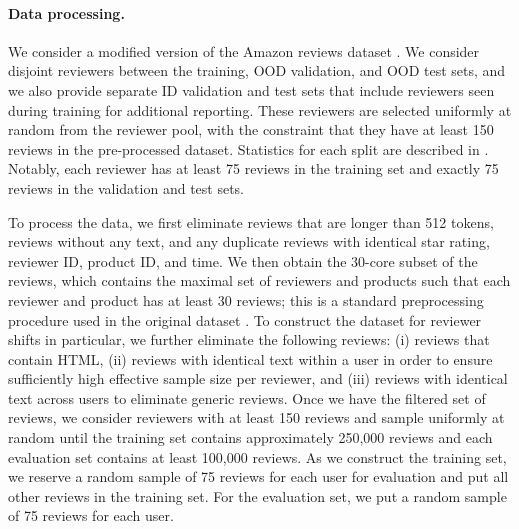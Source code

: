 \begin{table}[!tbp]
  \caption{Dataset details for \Amazon.}\label{tab:dataset_amazon}
  \centering
\end{table}


\paragraph{Data processing.}
We consider a modified version of the Amazon reviews dataset \citep{ni2019justifying}.
We consider disjoint reviewers between the training, OOD validation, and OOD test sets, and we also provide separate ID validation and test sets that include reviewers seen during training for additional reporting.
These reviewers are selected uniformly at random from the reviewer pool, with the constraint that they have at least 150 reviews in the pre-processed dataset.
Statistics for each split are described in .
Notably, each reviewer has at least 75 reviews in the training set and exactly 75 reviews in the validation and test sets.

To process the data, we first eliminate reviews that are longer than 512 tokens, reviews without any text, and any duplicate reviews with identical star rating, reviewer ID, product ID, and time.
We then obtain the 30-core subset of the reviews, which contains the maximal set of reviewers and products such that each reviewer and product has at least 30 reviews; this is a standard preprocessing procedure used in the original dataset \citep{ni2019justifying}.
To construct the dataset for reviewer shifts in particular, we further eliminate the following reviews:
(i) reviews that contain HTML,
(ii) reviews with identical text within a user in order to ensure sufficiently high effective sample size per reviewer,
and (iii) reviews with identical text across users to eliminate generic reviews.
Once we have the filtered set of reviews, we consider reviewers with at least 150 reviews and sample uniformly at random until the training set contains approximately 250,000 reviews and each evaluation set contains at least 100,000 reviews.
As we construct the training set, we reserve a random sample of 75 reviews for each user for evaluation and put all other reviews in the training set.
For the evaluation set, we put a random sample of 75 reviews for each user.

